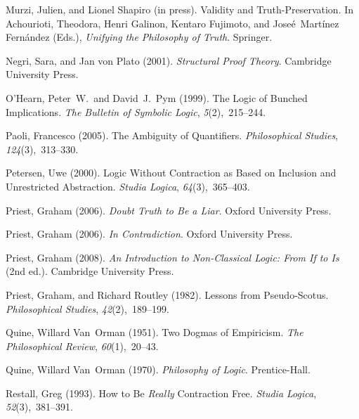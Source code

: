 \documentclass{ergoclass}
\begin{document}
\begin{thebibliography}{54}
Murzi, Julien, and Lionel Shapiro (in press).
\newblock Validity and Truth-Preservation.
\newblock In Achourioti, Theodora, Henri Galinon, Kentaro Fujimoto, and
  Jose{\'{e}}~Mart{\'{i}}nez Fern{\'{a}}ndez (Eds.), \emph{Unifying the
  Philosophy of Truth}. Springer.

Negri, Sara, and Jan von Plato (2001).
\newblock \emph{Structural Proof Theory}.
\newblock Cambridge University Press.

O'{H}earn, Peter~W.\, and David~J.\ Pym (1999).
\newblock The Logic of Bunched Implications.
\newblock \emph{The Bulletin of Symbolic Logic}, \emph{5}(2),~215--244.

Paoli, Francesco (2005).
\newblock The Ambiguity of Quantifiers.
\newblock \emph{Philosophical Studies}, \emph{124}(3),~313--330.

Petersen, Uwe (2000).
\newblock Logic Without Contraction as Based on Inclusion and Unrestricted
  Abstraction.
\newblock \emph{Studia Logica}, \emph{64}(3),~365--403.

Priest, Graham (2006{}).
\newblock \emph{Doubt Truth to Be a Liar}.
\newblock Oxford University Press.

Priest, Graham (2006{}).
\newblock \emph{In Contradiction}.
\newblock Oxford University Press.

Priest, Graham (2008).
\newblock \emph{An Introduction to Non-Classical Logic: From If to Is} (2nd
  ed.).
\newblock Cambridge University Press.

Priest, Graham, and Richard Routley (1982).
\newblock Lessons from {P}seudo-{S}cotus.
\newblock \emph{Philosophical Studies}, \emph{42}(2),~189--199.

Quine, Willard Van~Orman (1951).
\newblock Two Dogmas of Empiricism.
\newblock \emph{The Philosophical Review}, \emph{60}(1),~20--43.

Quine, Willard Van~Orman (1970).
\newblock \emph{Philosophy of Logic}.
\newblock Prentice-Hall.

Restall, Greg (1993).
\newblock How to Be {\em Really} Contraction Free.
\newblock \emph{Studia Logica}, \emph{52}(3),~381--391.


\end{thebibliography}
\end{document}
